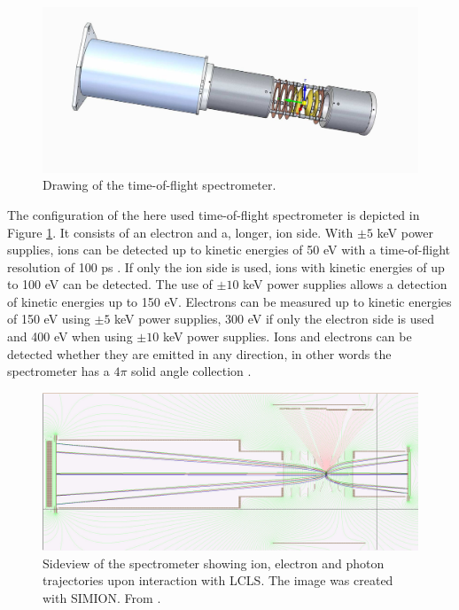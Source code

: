 \begin{figure}
   \includegraphics[width=1.\linewidth]{images/spectrometer.jpg}
    \caption{Drawing of the time-of-flight spectrometer.}
\label{fig:spectrometer-detail}
\end{figure}
The configuration of the here used time-of-flight spectrometer is depicted in Figure \ref{fig:spectrometer-detail}. It consists of an electron and a, longer, ion side. With $\pm 5$ keV power supplies, ions can be detected up to kinetic energies of 50 eV with a time-of-flight resolution of 100 ps \citep{Ferguson-2015-JSR}. If only the ion side is used, ions with kinetic energies of up to 100 eV can be detected. The use of $\pm 10$ keV power supplies allows a detection of kinetic energies up to 150 eV. Electrons can be measured up to kinetic energies of 150 eV using $\pm 5$ keV power supplies, 300 eV if only the electron side is used and 400 eV when using $\pm 10$ keV power supplies. Ions and electrons can be detected whether they are emitted in any direction, in other words the spectrometer has a $4\pi$ solid angle collection \citep{Osipov-2013-PC}.
\begin{figure}
   \includegraphics[width=1.\linewidth]{images/simion.jpg}
    \caption[Sideview of the spectrometer showing ion, electron and photon trajectories.]{Sideview of the spectrometer showing ion, electron and photon trajectories upon interaction with LCLS. The image was created with SIMION. From \citep{Osipov-2013-PC}.}
\label{fig:simion}
\end{figure}
